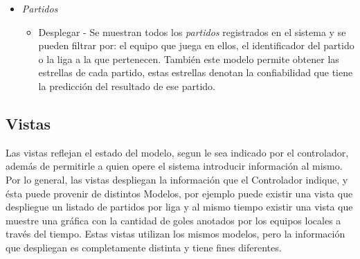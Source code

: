 \begin{itemize}
\begin{itemize}
				\end{itemize}
			\item \emph{Partidos}
				\begin{itemize}
					\item Desplegar - Se muestran todos los \emph{partidos} registrados en el sistema y se pueden filtrar por: el equipo que juega en ellos, el identificador del partido o la liga a la que pertenecen. También este modelo permite obtener las estrellas de cada partido, estas estrellas denotan la confiabilidad que tiene la predicción del resultado de ese partido.
				\end{itemize}
		\end{itemize}

		\subsection{Vistas}

		\graphicspath{{/Users/brunomedina/Dropbox/Tesis-Egobets/egobets-notas/resources/vistas/}}


		Las vistas reflejan el estado del modelo, segun le sea indicado por el controlador, además de permitirle a quien opere el sistema introducir información al mismo. Por lo general, las vistas despliegan la información que el Controlador indique, y ésta puede provenir de distintos Modelos, por ejemplo puede existir una vista que despliegue un listado de partidos por liga y al mismo tiempo existir una vista que muestre una gráfica con la cantidad de goles anotados por los equipos locales a través del tiempo. Estas vistas utilizan los mismos modelos, pero la información que despliegan es completamente distinta y tiene fines diferentes.

